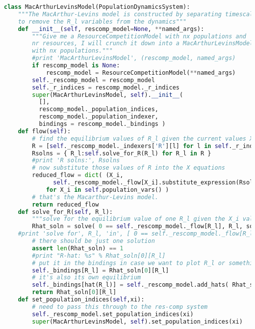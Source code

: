 \begin{lstlisting}[language=Python]
class MacArthurLevinsModel(PopulationDynamicsSystem):
    """The MacArthur-Levins model is constructed by separating timescales
    to remove the R_l variables from the dynamics"""
    def __init__(self, rescomp_model=None, **named_args):
        """Give me a ResourceCompetitionModel with nx populations and
        nr resources, I will crunch it down into a MacArthurLevinsModel
        with nx populations."""
        #print 'MacArthurLevinsModel', (rescomp_model, named_args)
        if rescomp_model is None:
            rescomp_model = ResourceCompetitionModel(**named_args)
        self._rescomp_model = rescomp_model
        self._r_indices = rescomp_model._r_indices
        super(MacArthurLevinsModel, self).__init__(
          [],
          rescomp_model._population_indices,
          rescomp_model._population_indexer,
          bindings = rescomp_model._bindings )
    def flow(self):
        # find the equilibrium values of R_l given the current values X_i
        R = [self._rescomp_model._indexers['R'][l] for l in self._r_indices]
        Rsolns = { R_l:self.solve_for_R(R_l) for R_l in R }
        #print 'R solns:', Rsolns
        # now substitute those values of R into the X equations
        reduced_flow = dict( (X_i,
              self._rescomp_model._flow[X_i].substitute_expression(Rsolns) )
            for X_i in self.population_vars() )
        # that's the Macarthur-Levins model.
        return reduced_flow
    def solve_for_R(self, R_l):
        """solve for the equilibrium value of one R_l given the X_i values"""
        Rhat_soln = solve( 0 == self._rescomp_model._flow[R_l], R_l, solution_dict=True )
	#print 'solve for', R_l, 'in', [ 0 == self._rescomp_model._flow[R_l] ], ' => ', Rhat_soln
        # there should be just one solution
        assert len(Rhat_soln) == 1
        #print "R-hat: %s" % Rhat_soln[0][R_l]
        # put it in the bindings in case we want to plot R_l or something
        self._bindings[R_l] = Rhat_soln[0][R_l]
        # it's also its own equilibrium
        self._bindings[hat(R_l)] = self._rescomp_model.add_hats( Rhat_soln[0][R_l] )
        return Rhat_soln[0][R_l]
    def set_population_indices(self,xi):
        # need to pass this through to the res-comp system
        self._rescomp_model.set_population_indices(xi)
        super(MacArthurLevinsModel, self).set_population_indices(xi)

\end{lstlisting}
